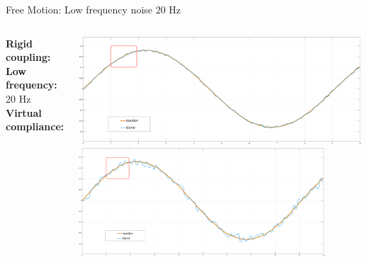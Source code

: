 \documentclass[10pt]{beamer}
\begin{document}
\begin{frame}{Free Motion: Low frequency noise 20 Hz}
  \smallskip
  \begin{columns}
    \color{Orange}\textbf{Rigid coupling:}\\
    \bigskip
    \bigskip
    \bigskip
    \color{black}\textbf{Low frequency:} 20 Hz\\
    \bigskip
    \bigskip
    \bigskip
    \color{LightBlue}\textbf{Virtual compliance:}\\

    
    \includegraphics[width=\textwidth,
    height=0.45\textwidth]{../reportTeleop/Images/freerigidTot20HtznoiseRect}\\
    \smallskip
    \includegraphics[width=\textwidth,
    height=0.45\textwidth]{../reportTeleop/Images/freeSet20Tot20HtznoiseRect}
  \end{columns}
  
\end{frame}
\end{document}
